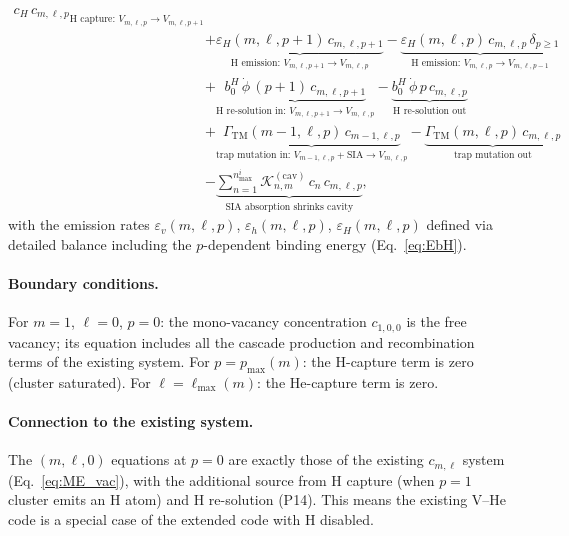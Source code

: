 \begin{equation}
{\begin{split}
{       c_H\,c_{m,\ell,p}
       }_{\text{H capture: }V_{m,\ell,p}\to V_{m,\ell,p+1}}
    \\[4pt]
    &+ \underbrace{
       \varepsilon_H(m,\ell,p{+}1)\,c_{m,\ell,p+1}
       }_{\text{H emission: }V_{m,\ell,p+1}\to V_{m,\ell,p}}
     - \underbrace{
       \varepsilon_H(m,\ell,p)\,c_{m,\ell,p}\,\delta_{p\geq 1}
       }_{\text{H emission: }V_{m,\ell,p}\to V_{m,\ell,p-1}}
    \\[4pt]
    &+ \underbrace{
       b_0^H\,\dot{\phi}\,(p{+}1)\,c_{m,\ell,p+1}
       }_{\text{H re-solution in: }V_{m,\ell,p+1}\to V_{m,\ell,p}}
     - \underbrace{
       b_0^H\,\dot{\phi}\,p\,c_{m,\ell,p}
       }_{\text{H re-solution out}}
    \\[4pt]
    &+ \underbrace{
       \Gamma_{\mathrm{TM}}(m{-}1,\ell,p)\,c_{m-1,\ell,p}
       }_{\text{trap mutation in: }V_{m-1,\ell,p}+\text{SIA}\to V_{m,\ell,p}}
     - \underbrace{
       \Gamma_{\mathrm{TM}}(m,\ell,p)\,c_{m,\ell,p}
       }_{\text{trap mutation out}}
    \\[4pt]
    &- \underbrace{
       \sum_{n=1}^{n_{\max}^i}
       \mathcal{K}_{n,m}^{(\mathrm{cav})}\,c_n\,c_{m,\ell,p}
       }_{\text{SIA absorption shrinks cavity}},
\end{split}
}
\end{equation}
with the emission rates $\varepsilon_v(m,\ell,p)$,
$\varepsilon_h(m,\ell,p)$, $\varepsilon_H(m,\ell,p)$ defined via
detailed balance including the $p$-dependent binding energy
(Eq.~\ref{eq:EbH}).

\paragraph{Boundary conditions.}
For $m = 1$, $\ell = 0$, $p = 0$: the mono-vacancy concentration
$c_{1,0,0}$ is the free vacancy; its equation includes all the
cascade production and recombination terms of the existing system.
For $p = p_{\max}(m)$: the H-capture term is zero (cluster saturated).
For $\ell = \ell_{\max}(m)$: the He-capture term is zero.

\paragraph{Connection to the existing system.}
The $(m,\ell,0)$ equations at $p=0$ are exactly those of the existing
$c_{m,\ell}$ system (Eq.~\ref{eq:ME_vac}), with the additional source
from H capture (when $p=1$ cluster emits an H atom) and H re-solution
(P14). This means the existing V--He code is a special case of the
extended code with H disabled.

